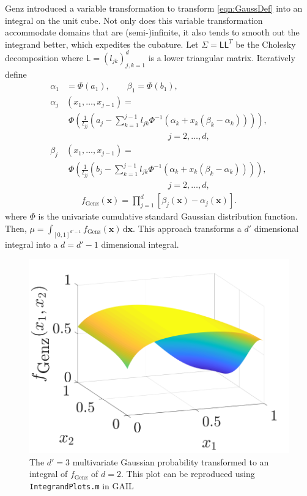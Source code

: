 \documentclass[twocolumn]{svjour3}          %
\newcommand{\bm}[1]{\boldsymbol{#1}}
\newcommand{\mSigma}{\mathsf{\Sigma}}
\newcommand{\dif}[1]{\text{d}{#1}}
\newcommand{\vx}{\bm{x}}
\newcommand{\dvx}{\dif{\bm{x}}}
\newcommand{\mL}{\mathsf{L}}
\newcommand{\code}[1]{\texttt{#1}}
\begin{document}
Genz \cite{Gen93} introduced a variable transformation to transform \eqref{eqn:GaussDef} into an integral on the unit cube.  Not only does this variable transformation accommodate domains that are (semi-)infinite, it also tends to smooth out the integrand better, which expedites the cubature.  Let $\mSigma= \mL \mL^T$ be the Cholesky decomposition where $\mL = (l_{jk})_{j,k=1}^d$ is a lower triangular matrix.  Iteratively define
\allowdisplaybreaks
\begin{align*}
\alpha_1& = \Phi(a_1), \qquad \beta_1 = \Phi(b_1),
\\
\alpha_j&(x_1,\dots,x_{j-1}) = 
\\
&\; \Phi
\left(
\frac{1}{l_{jj}} 
\left(
a_j - \sum_{k=1}^{j-1} l_{jk} \Phi^{-1}(\alpha_k + x_k(\beta_k-\alpha_k))
\right)
\right), 
\\
&\hspace{5cm} j=2,\dots,d,
\\
\beta_j&(x_1,\dots,x_{j-1}) = 
\\
&\; \Phi
\left(
\frac{1}{l_{jj}} 
\left(
b_j - \sum_{k=1}^{j-1} l_{jk} \Phi^{-1}(\alpha_k + x_k(\beta_k-\alpha_k))
\right)
\right), 
\\
&\hspace{5cm} j=2,\dots,d,
\end{align*}
\begin{align}
\label{fGenzdef}
f_{\text{Genz}}(\vx) = \prod_{j=1}^d [\beta_j(\vx) - \alpha_j(\vx)].
\end{align}
where $\Phi$ is the univariate cumulative standard Gaussian distribution function.  Then, $\mu = \int_{[0,1]^{d'-1}} f_{\text{Genz}}(\vx) \, \dvx$. This approach transforms a $d'$ dimensional integral into a $d=d'-1$ dimensional integral.

\begin{figure}
	\captionsetup[subfigure]{labelformat=empty}
	\centering
		\includegraphics[width=0.7\linewidth]{GenzFunc_varTx_none}
	\caption{The $d'=3$ multivariate Gaussian probability transformed to an integral of $f_{\text{Genz}}$ of $d=2$. This plot can be reproduced using \code{IntegrandPlots.m} in GAIL}
	\label{fig:MVN_Genz}
\end{figure}
\end{document}
